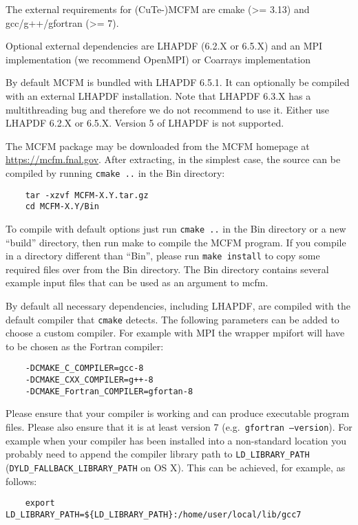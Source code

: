 \label{sec:Installation}


The external requirements for (CuTe-)MCFM are cmake (\textgreater=
3.13) and gcc/g++/gfortran (\textgreater= 7).

 Optional external dependencies are LHAPDF (6.2.X or 6.5.X) and an MPI
 implementation (we recommend OpenMPI) or Coarrays implementation
 
 By default MCFM is bundled with LHAPDF 6.5.1. It can optionally be
 compiled with an external LHAPDF installation. Note that LHAPDF 6.3.X has
 a multithreading bug and therefore we do not recommend to use it.
 Either use LHAPDF 6.2.X or 6.5.X. Version 5 of LHAPDF is not supported.
 
 The MCFM package may be downloaded from the MCFM homepage at
 \url{https://mcfm.fnal.gov}. After extracting, in the simplest case, the
 source can be compiled by running \texttt{cmake\ ..} in the Bin
 directory: 
 \begin{verbatim}
 	tar -xzvf MCFM-X.Y.tar.gz
 	cd MCFM-X.Y/Bin
 \end{verbatim}
 
 To compile with default options just run \texttt{cmake\ ..} in the Bin
 directory or a new ``build'' directory, then run make to compile the
 MCFM program. If you compile in a directory different than ``Bin'',
 please run \texttt{make\ install} to copy some required files over from
 the Bin directory. The Bin directory contains several example input
 files that can be used as an argument to mcfm.
 
 By default all necessary dependencies, including LHAPDF, are compiled
 with the default compiler that \texttt{cmake} detects. The following
 parameters can be added to choose a custom compiler. For example with
 MPI the wrapper mpifort will have to be chosen as the Fortran compiler: 
 \begin{verbatim}
 	-DCMAKE_C_COMPILER=gcc-8
 	-DCMAKE_CXX_COMPILER=g++-8
 	-DCMAKE_Fortran_COMPILER=gfortan-8
 \end{verbatim}
 
 Please ensure that your compiler is working and can produce executable
 program files. Please also ensure that it is at least version 7
 (e.g.~\texttt{gfortran\ --version}). For example when your compiler
 has been installed into a non-standard location you probably need to
 append the compiler library path to \texttt{LD\_LIBRARY\_PATH}
 (\texttt{DYLD\_FALLBACK\_LIBRARY\_PATH} on OS X). This can be achieved,
 for example, as follows: 
 \begin{verbatim}
 	export LD_LIBRARY_PATH=${LD_LIBRARY_PATH}:/home/user/local/lib/gcc7
 \end{verbatim}
 
